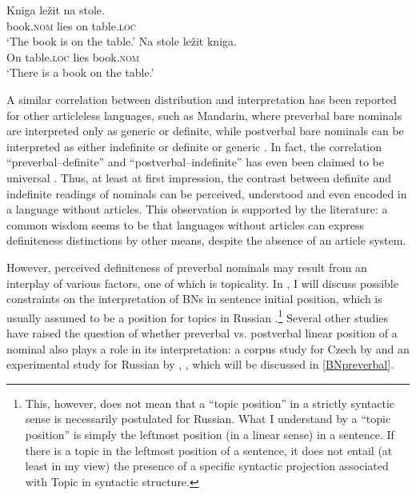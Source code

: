 \documentclass[output=paper,colorlinks,citecolor=brown]{langscibook}
\begin{document}
\ea \label{kniga}
\ea \gll Kniga			le\v{z}it	na	stole.\\
book.\textsc{nom} 	lies	on	table.\textsc{loc}\\
\glt `The book is on the table.'
\ex \gll Na stole le\v{z}it	kniga.\\
On	table.\textsc{loc} 	lies	book.\textsc{nom}\\
\glt `There is a book on the table.'
\z
\z

\noindent A similar correlation between distribution and interpretation has been reported for other articleless languages, such as Mandarin, where preverbal bare nominals are interpreted only as generic or definite, while postverbal bare nominals can be interpreted as either indefinite or definite or generic \citep{chengsybesma14}. In fact, the correlation ``preverbal--definite'' and ``postverbal--indefinite'' has even been claimed to be universal \citep{leiss07}.
Thus, at least at first impression, the contrast between definite and indefinite readings of nominals can be perceived, understood and even encoded in a language without articles.  This observation is supported by the literature: a common wisdom seems to be that languages without articles can express definiteness distinctions by other means, despite the absence of an article system. 

However, perceived definiteness of preverbal nominals may result from an interplay of various factors, one of which is topicality. In , I will discuss possible constraints on the interpretation of BNs in sentence initial position, which is usually assumed to be a position for topics in Russian \citep[see, for instance,][]{geist10, jasinskaja16}.\footnote{This, however, does not mean that a ``topic position'' in a strictly syntactic sense is necessarily postulated for Russian. What I understand by a ``topic position'' is simply the leftmost position (in a linear sense) in a sentence. If there is a topic in the leftmost position of a sentence, it does not entail (at least in my view) the presence of a specific syntactic projection associated with Topic in syntactic structure.} Several other studies have raised the question of whether preverbal vs. postverbal linear position of a nominal also plays a role in its interpretation: a corpus study for Czech by \citet{simik-burianova20} and an experimental study for Russian by \citet{Borik.etal2020}, \citet{seresetal}, which will be discussed in \ref{BNpreverbal}.  %
\end{document}
